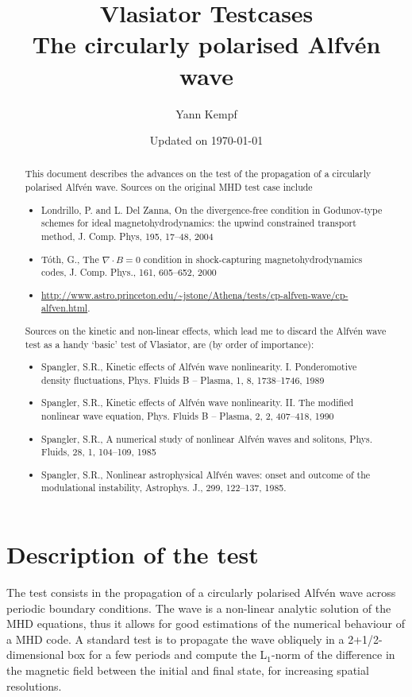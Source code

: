 \documentclass[a4paper,10pt]{scrartcl}
\title{
\Huge{Vlasiator Testcases} \\
\LARGE{The circularly polarised Alfvén wave}
}
\author{Yann Kempf}
\date{Updated on \today}
\begin{document}
\maketitle

\begin{abstract}
This document describes the advances on the test of the propagation of a circularly polarised Alfvén wave. Sources on the original MHD test case include
\begin{itemize}
 \item Londrillo, P. and L. Del Zanna, On the divergence-free condition in Godunov-type schemes for ideal magnetohydrodynamics: the upwind constrained transport method, J. Comp. Phys, 195, 17--48, 2004
 \item Tóth, G., The $\nabla \cdot B = 0$ condition in shock-capturing magnetohydrodynamics codes, J. Comp. Phys., 161, 605--652, 2000
 \item \url{http://www.astro.princeton.edu/~jstone/Athena/tests/cp-alfven-wave/cp-alfven.html}.
\end{itemize}

Sources on the kinetic and non-linear effects, which lead me to discard the Alfvén wave test as a handy `basic' test of Vlasiator, are (by order of importance):
\begin{itemize}
 \item Spangler, S.R., Kinetic effects of Alfvén wave nonlinearity. I. Ponderomotive density fluctuations, Phys. Fluids B -- Plasma, 1, 8, 1738--1746, 1989
 \item Spangler, S.R., Kinetic effects of Alfvén wave nonlinearity. II. The modified nonlinear wave equation, Phys. Fluids B -- Plasma, 2, 2, 407--418, 1990
 \item Spangler, S.R., A numerical study of nonlinear Alfvén waves and solitons, Phys. Fluids, 28, 1, 104--109, 1985
 \item Spangler, S.R., Nonlinear astrophysical Alfvén waves: onset and outcome of the modulational instability, Astrophys. J., 299, 122--137, 1985.
\end{itemize}

\end{abstract}


\section{Description of the test}
The test consists in the propagation of a circularly polarised Alfvén wave across periodic boundary conditions. The wave is a non-linear analytic solution of the MHD equations, thus it allows for good estimations of the numerical behaviour of a MHD code. A standard test is to propagate the wave obliquely in a 2+1/2-dimensional box for a few periods and compute the L$_1$-norm of the difference in the magnetic field between the initial and final state, for increasing spatial resolutions.
\end{document}
